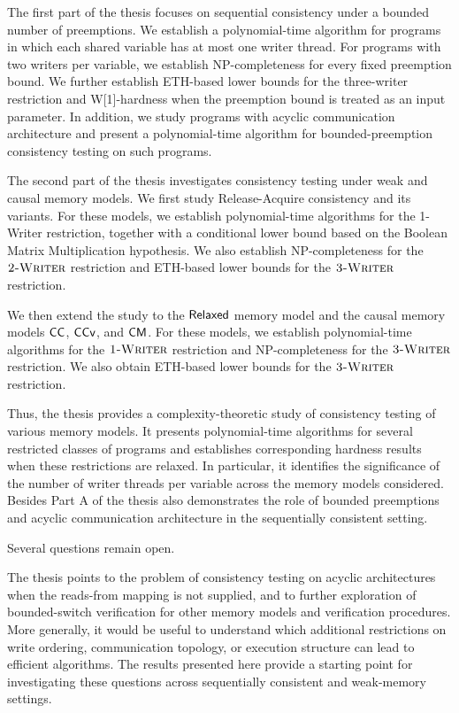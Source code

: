 \documentclass[12pt,a4paper]{report}
\begin{document}
The first part of the thesis focuses on sequential consistency under a bounded number of preemptions. We establish a polynomial-time algorithm for programs in which each shared variable has at most one writer thread. For programs with two writers per variable, we establish NP-completeness for every fixed preemption bound. We further establish ETH-based lower bounds for the three-writer restriction and W[1]-hardness when the preemption bound is treated as an input  parameter. In addition, we study programs with acyclic communication architecture and present a polynomial-time algorithm for bounded-preemption consistency testing on such programs.

The second part of the thesis investigates consistency testing under weak and causal memory models. We first study Release-Acquire consistency and its variants. For these models, we establish polynomial-time algorithms for the 1-Writer restriction, together with a  conditional lower bound based on the Boolean Matrix Multiplication hypothesis. We also establish NP-completeness for the $\textsc{2-Writer}$ restriction and ETH-based lower bounds for the $\textsc{3-Writer}$ restriction.

We then extend the study to the $\mathsf{Relaxed}$ memory model and the causal memory models $\mathsf{CC}$, $\mathsf{CCv}$, and $\mathsf{CM}$. For these models, we establish polynomial-time algorithms for the $\textsc{1-Writer}$ restriction and NP-completeness for the $\textsc{3-Writer}$ restriction. We also obtain ETH-based lower bounds for the $\textsc{3-Writer}$ restriction.

Thus, the thesis provides a complexity-theoretic study of consistency testing of various memory models. It presents polynomial-time algorithms for several restricted classes of programs and establishes corresponding hardness results when these restrictions are relaxed. In particular, it identifies the significance of the number of writer threads per variable across the memory models considered. Besides  Part A of the thesis also demonstrates the role of bounded preemptions and acyclic communication architecture in the sequentially consistent setting.

Several questions remain open. 

The thesis points to the problem of consistency testing on acyclic architectures when the reads-from mapping is not supplied, and to further exploration of bounded-switch verification for other memory models and verification procedures. More generally, it would be useful to understand which additional restrictions on write ordering, communication topology, or execution structure can lead to efficient algorithms. The results presented here provide a starting point for investigating these questions across sequentially consistent and weak-memory settings.



\label{Conclusion} 



\end{document}
